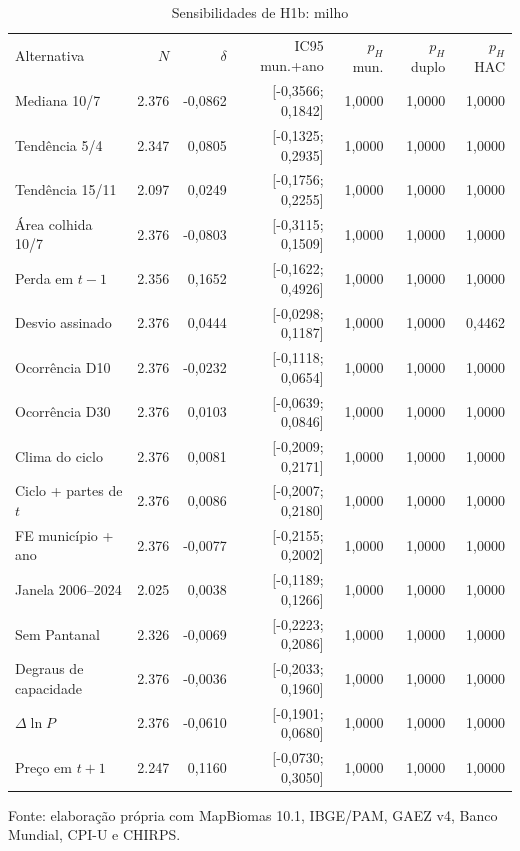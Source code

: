 \begin{table}[htbp]
\centering
\footnotesize
\setlength{\tabcolsep}{3pt}
\renewcommand{\arraystretch}{1.1}
\normalcaption\captionstyle{\centering}
\caption{Sensibilidades de H1b: milho}
\label{tab:h1-sens-milho}
\begin{tabular}{lrrrrrr}
\hline
Alternativa & $N$ & $\delta$ & IC95 mun.+ano & $p_H$ mun. & $p_H$ duplo & $p_H$ HAC \\
Mediana 10/7 & 2.376 & -0,0862 & [-0,3566; 0,1842] & 1,0000 & 1,0000 & 1,0000 \\
Tendência 5/4 & 2.347 & 0,0805 & [-0,1325; 0,2935] & 1,0000 & 1,0000 & 1,0000 \\
Tendência 15/11 & 2.097 & 0,0249 & [-0,1756; 0,2255] & 1,0000 & 1,0000 & 1,0000 \\
Área colhida 10/7 & 2.376 & -0,0803 & [-0,3115; 0,1509] & 1,0000 & 1,0000 & 1,0000 \\
Perda em $t-1$ & 2.356 & 0,1652 & [-0,1622; 0,4926] & 1,0000 & 1,0000 & 1,0000 \\
Desvio assinado & 2.376 & 0,0444 & [-0,0298; 0,1187] & 1,0000 & 1,0000 & 0,4462 \\
Ocorrência D10 & 2.376 & -0,0232 & [-0,1118; 0,0654] & 1,0000 & 1,0000 & 1,0000 \\
Ocorrência D30 & 2.376 & 0,0103 & [-0,0639; 0,0846] & 1,0000 & 1,0000 & 1,0000 \\
Clima do ciclo & 2.376 & 0,0081 & [-0,2009; 0,2171] & 1,0000 & 1,0000 & 1,0000 \\
Ciclo + partes de $t$ & 2.376 & 0,0086 & [-0,2007; 0,2180] & 1,0000 & 1,0000 & 1,0000 \\
FE município + ano & 2.376 & -0,0077 & [-0,2155; 0,2002] & 1,0000 & 1,0000 & 1,0000 \\
Janela 2006--2024 & 2.025 & 0,0038 & [-0,1189; 0,1266] & 1,0000 & 1,0000 & 1,0000 \\
Sem Pantanal & 2.326 & -0,0069 & [-0,2223; 0,2086] & 1,0000 & 1,0000 & 1,0000 \\
Degraus de capacidade & 2.376 & -0,0036 & [-0,2033; 0,1960] & 1,0000 & 1,0000 & 1,0000 \\
$\Delta\ln P$ & 2.376 & -0,0610 & [-0,1901; 0,0680] & 1,0000 & 1,0000 & 1,0000 \\
Preço em $t+1$ & 2.247 & 0,1160 & [-0,0730; 0,3050] & 1,0000 & 1,0000 & 1,0000 \\
\hline\end{tabular}
\par\smallskip
\begin{minipage}{\textwidth}\footnotesize\centering
Fonte: elaboração própria com MapBiomas 10.1, IBGE/PAM, GAEZ v4, Banco Mundial, CPI-U e CHIRPS.
\end{minipage}
\end{table}
